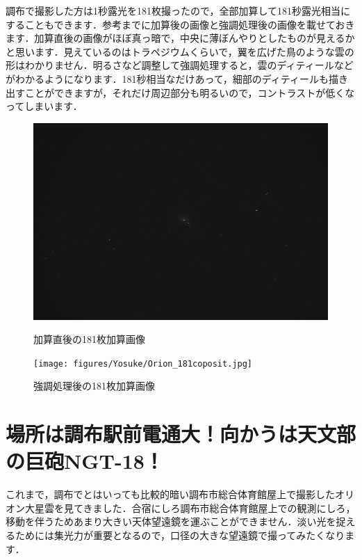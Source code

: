\documentclass[../../super_nova_2023]{subfiles}
\begin{document}
調布で撮影した方は1秒露光を181枚撮ったので，全部加算して181秒露光相当にすることもできます．参考までに加算後の画像と強調処理後の画像を載せておきます．加算直後の画像がほぼ真っ暗で，中央に薄ぼんやりとしたものが見えるかと思います．見えているのはトラペジウムくらいで，翼を広げた鳥のような雲の形はわかりません．明るさなど調整して強調処理すると，雲のディティールなどがわかるようになります．181秒相当なだけあって，細部のディティールも描き出すことができますが，それだけ周辺部分も明るいので，コントラストが低くなってしまいます．
\begin{figure}[H]
	\centering
	\begin{minipage}{0.4\columnwidth}
		\centering
		\includegraphics[width=\columnwidth]{figures/Yosuke/Orion_181coposit_non.jpg}
		\caption{加算直後の181枚加算画像}
		\label{fig:Orion_181coposit_non}
	\end{minipage}
	\begin{minipage}{0.4\columnwidth}
		\centering
		\texttt{[image: figures/Yosuke/Orion\_181coposit.jpg]}
		\caption{強調処理後の181枚加算画像}
		\label{fig:Orion_181coposit}
	\end{minipage}
\end{figure}

\section{場所は調布駅前電通大！向かうは天文部の巨砲NGT-18！}
これまで，調布でとはいっても比較的暗い調布市総合体育館屋上で撮影したオリオン大星雲を見てきました．合宿にしろ調布市総合体育館屋上での観測にしろ，移動を伴うためあまり大きい天体望遠鏡を運ぶことができません．淡い光を捉えるためには集光力が重要となるので，口径の大きな望遠鏡で撮ってみたくなります．
\end{document}

